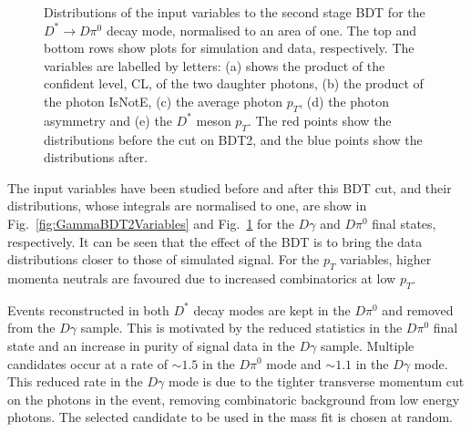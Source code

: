 \documentclass[oneside,12pt]{article}
\begin{document}
\begin{figure}[H]
  \caption{{Distributions of the input variables to the second stage BDT for
      the $D^* \rightarrow D\pi^0$ decay mode, normalised to an area of one. The top
      and bottom rows show plots for simulation and data, respectively. The variables
      are labelled by letters: (a) shows the product of the confident level, CL, of
      the two daughter photons, (b) the product of the photon IsNotE, (c) the average
      photon $p_T$, (d) the photon asymmetry and (e) the $D^*$ meson $p_T$. The red
      points show the distributions before the cut on BDT2, and the blue points show
  the distributions after.}} \label{fig:Pi0BDT2Variables}
\end{figure}

The input variables have been studied before and after this BDT cut, and their
distributions, whose integrals are normalised to one, are show in
Fig.~\ref{fig:GammaBDT2Variables} and Fig.~\ref{fig:Pi0BDT2Variables} for the
$D\gamma$ and $D\pi^0$ final states, respectively. It can be seen that the
effect of the BDT is to bring the data distributions closer to those of
simulated signal. For the $p_T$ variables, higher momenta neutrals are favoured due
to increased combinatorics at low $p_T$.

Events reconstructed in both $D^{*}$ decay modes are kept in the $D\pi^0$
and removed from the $D\gamma$ sample. This is motivated by the reduced
statistics in the $D\pi^0$ final state and an increase in purity of signal data
in the $D\gamma$ sample. Multiple candidates occur at a rate of $\sim 1.5$ in
the $D\pi^0$ mode and $\sim 1.1$ in the $D\gamma$ mode. This reduced rate in the
$D\gamma$ mode is due to the tighter transverse momentum cut on the photons in
the event, removing combinatoric background from low energy photons. The
selected candidate to be used in the mass fit is chosen at random.
\end{document}
